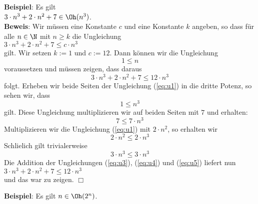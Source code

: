 \noindent
\textbf{Beispiel}: Es gilt \\[0.1cm]
\hspace*{1.3cm} $3 \cdot n^3 + 2 \cdot n^2 + 7 \in \Oh(n^3)$. \\[0.1cm]
\textbf{Beweis}: Wir m\"ussen eine Konstante $c$ und eine Konstante $k$ angeben, so dass f\"ur
alle $n\in \N$ mit $n \geq k$ die Ungleichung
\\[0.1cm]
\hspace*{1.3cm} 
$3 \cdot n^3 + 2 \cdot n^2 + 7 \leq c \cdot n^3$
\\[0.1cm]
gilt.  Wir setzen  $k := 1$ und $c := 12$. Dann k\"onnen wir die Ungleichung 
\begin{equation}
  \label{eq:u1}
  1\leq n  
\end{equation}
voraussetzen und m\"ussen zeigen, dass daraus 
\begin{equation}
  \label{eq:u2}
  3 \cdot n^3 + 2 \cdot n^2 + 7 \leq 12 \cdot n^3  
\end{equation}
folgt. Erheben wir beide Seiten der  Ungleichung (\ref{eq:u1}) in die dritte Potenz, so sehen wir,
dass 
\begin{equation}
  \label{eq:u3pre}
  1 \leq n^3  
\end{equation}
gilt.  Diese Ungleichung multiplizieren wir auf beiden Seiten mit $7$ und erhalten: 
\begin{equation}
  \label{eq:u3}
  7 \leq 7 \cdot n^3
\end{equation}
Multiplizieren wir die Ungleichung (\ref{eq:u1}) mit $2\cdot n^2$, so erhalten wir 
\begin{equation}
  \label{eq:u4}
  2 \cdot n^2 \leq 2 \cdot n^3  
\end{equation}
Schlie\3lich gilt trivialerweise 
\begin{equation}
  \label{eq:u5}
  3 \cdot n^3 \leq 3 \cdot n^3
\end{equation}
Die Addition der Ungleichungen (\ref{eq:u3}), (\ref{eq:u4}) und (\ref{eq:u5}) liefert nun \\[0.1cm]
\hspace*{1.3cm} $3 \cdot n^3 + 2 \cdot n^2 + 7 \leq 12 \cdot n^3$ \\[0.1cm]
und das war zu zeigen. \hspace*{\fill} $\Box$
\vspace*{0.3cm}

\noindent
\textbf{Beispiel}: Es gilt  $n \in \Oh(2^n)$. 
\vspace*{0.3cm}

